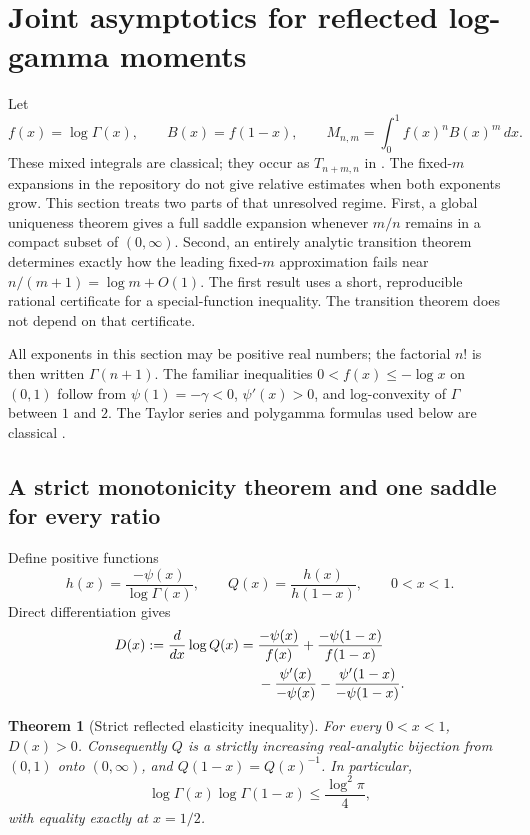 \documentclass[11pt,letterpaper]{article}
\numberwithin{equation}{section}
\theoremstyle{plain}
\newtheorem{theorem}{Theorem}[section]
\theoremstyle{definition}
\theoremstyle{remark}
\begin{document}


\section{Joint asymptotics for reflected log-gamma moments}
\label{cont26:joint:sec:main}

Let
\[
 f(x)=\log\Gamma(x),\qquad B(x)=f(1-x),\qquad
 M_{n,m}=\int_0^1 f(x)^n B(x)^m\,dx.
\]
These mixed integrals are classical; they occur as $T_{n+m,n}$ in
\cite[Section~5]{ACEMKM}.  The fixed-$m$ expansions in the
repository do not give relative estimates when both exponents grow.
This section treats two parts of that unresolved regime.  First, a
global uniqueness theorem gives a full saddle expansion whenever
$m/n$ remains in a compact subset of $(0,\infty)$.  Second, an entirely
analytic transition theorem determines exactly how the leading
fixed-$m$ approximation fails near $n/(m+1)=\log m+O(1)$.
The first result uses a short, reproducible rational certificate for a
special-function inequality.  The transition theorem does not depend
on that certificate.

All exponents in this section may be positive real numbers; the
factorial $n!$ is then written $\Gamma(n+1)$.  The familiar inequalities
$0<f(x)\le-\log x$ on $(0,1)$ follow from $\psi(1)=-\gamma<0$,
$\psi'(x)>0$, and log-convexity of $\Gamma$ between $1$ and $2$.
The Taylor series and polygamma formulas used below are classical
\cite{DLMFTaylor,DLMFPolygamma}.

\subsection{A strict monotonicity theorem and one saddle for every ratio}

Define positive functions
\begin{equation}\label{cont26:joint:eq:hQ}
 h(x)=\frac{-\psi(x)}{\log\Gamma(x)},\qquad
 Q(x)=\frac{h(x)}{h(1-x)},\qquad 0<x<1.
\end{equation}
Direct differentiation gives
\begin{align}\label{cont26:joint:eq:D}
 D(x):=\frac{d}{dx}\log Q(x)
 ={}&\frac{-\psi(x)}{f(x)}+
     \frac{-\psi(1-x)}{f(1-x)}\notag\\
 &-\frac{\psi'(x)}{-\psi(x)}-
     \frac{\psi'(1-x)}{-\psi(1-x)}.
\end{align}

\begin{theorem}[Strict reflected elasticity inequality]
\label{cont26:joint:thm:Q}
For every $0<x<1$, $D(x)>0$.  Consequently $Q$ is a strictly increasing
real-analytic bijection from $(0,1)$ onto $(0,\infty)$, and
$Q(1-x)=Q(x)^{-1}$.  In particular,
\begin{equation}\label{cont26:joint:eq:product}
 \log\Gamma(x)\log\Gamma(1-x)
 \le \frac{\log^2\pi}{4},
\end{equation}
with equality exactly at $x=1/2$.
\end{theorem}
\end{document}
